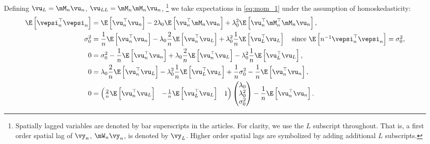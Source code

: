Defining $\vu_{L} = \mM_n\vu_n$, $\vu_{LL} = \mM_n\mM_n\vu_n$, \footnote{Spatially lagged variables are denoted by bar superscripts in the articles. For clarity, we use the $L$ subscript throughout. That is, a first order spatial lag of $\vy_n$, $\mW_n\vy_n$, is denoted by $\vy_L$. Higher order spatial lags are symbolized by adding additional $L$ subscripts.} we take expectations in \eqref{eq:mom_1} under the assumption of homoskedasticity:
\begin{equation}\label{eq:Pequation_1_gmm}
  \begin{aligned}
      \E\left[\vepsi^\top_n \vepsi_n\right] & = \E\left[\vu^\top_n\vu_n\right] - 2\lambda_0\E\left[\vu^\top_n\mM_n\vu_n\right] + \lambda^2_0\E\left[\vu^\top_n\mM^\top_n\mM_n\vu_n\right], \\
       \sigma^2_0& = \frac{1}{n}\E\left[\vu^\top_n\vu_n\right] - \lambda_0 \frac{2}{n}\E\left[\vu^\top_n\vu_L\right] + \lambda^2_0\frac{1}{n}\E\left[\vu_L^\top\vu_L\right] \quad \mbox{since $\E\left[n^{-1}\vepsi^\top_n \vepsi_n\right] = \sigma^2_0$},\\
       0 &= \sigma^2_0  - \frac{1}{n}\E\left[\vu^\top_n\vu_n\right] + \lambda_0 \frac{2}{n}\E\left[\vu^\top_n\vu_L\right] - \lambda^2_0\frac{1}{n}\E\left[\vu_L^\top\vu_L\right],\\
       0 &= \lambda_0 \frac{2}{n}\E\left[\vu^\top_n\vu_L\right] - \lambda^2_0\frac{1}{n}\E\left[\vu_L^\top\vu_L\right] + \frac{1}{n}\sigma^2_0 - \frac{1}{n}\E\left[\vu^\top_n\vu_n\right], \\
       0 & =  \begin{pmatrix}
         \frac{2}{n}\E\left[\vu^\top_n\vu_L\right] & - \frac{1}{n}\E\left[\vu_L^\top\vu_L\right] &  1
            \end{pmatrix}
            \begin{pmatrix}
              \lambda_0 \\
              \lambda^2_0 \\
              \sigma^2_0
            \end{pmatrix} - \frac{1}{n}\E\left[\vu^\top_n\vu_n\right].
  \end{aligned}
\end{equation}

